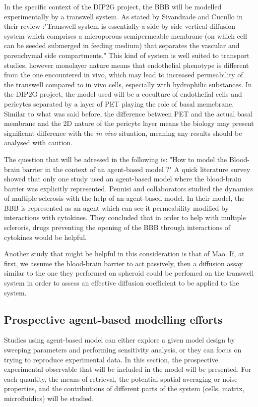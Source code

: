 \documentclass[11pt,a4paper]{article}
\begin{document}
In the specific context of the DIP2G project, the BBB will be modelled experimentally by a transwell system. As stated by Sivandzade and Cucullo in their review :"Transwell system is essentially a side by side vertical diffusion system which comprises a microporous semipermeable membrane (on which cell can be seeded submerged in feeding medium) that separates the vascular and parenchymal side compartments."\cite{Sivandzade2018} This kind of system is well suited to transport studies, however monolayer nature means that endothelial phenotype is different from the one encountered in vivo, which may lead to increased permeability of the transwell compared to in vivo cells, especially with hydrophilic substances. In the DIP2G project, the model used will be a coculture of endothelial cells and pericytes separated by a layer of PET playing the role of basal memebrane. Similar to what was said before, the difference between PET and the actual basal membrane and the 2D nature of the pericyte layer means the biology may present significant difference with the \textit{in vivo} situation, meaning any results should be analysed with caution. 

The question that will be adressed in the following is: "How to model the Blood-brain barrier in the context of an agent-based model ?"
A quick literature survey showed that only one study used an agent-based model where the blood-brain barrier was explicitly represented. Pennisi and collaborators studied the dynamics of multiple sclerosis with the help of an agent-based model.\cite{Pennisi2015} In their model, the BBB is represented as an agent which can see it permeability modified by interactions with cytokines. They concluded that in order to help with multiple scleroris, drugs preventing the opening of the BBB through interactions of cytokines would be helpful.

Another study that might be helpful in this consideration is that of Mao.\cite{Mao2018} If, at first, we assume the blood-brain barrier to act passively, then a diffusion assay similar to the one they performed on spheroid could be perfomed on the transwell system in order to assess an effective diffusion coefficient to be applied to the system. %


\subsection{Prospective agent-based modelling efforts}
Studies using agent-based model can either explore a given model design by sweeping parameters and performing sensitivity analysis, or they can focus on trying to reproduce experimental data. In this section, the prospective experimental observable that will be included in the model will be presented. For each quantity, the means of retrieval, the potential spatial averaging or noise properties, and the contributions of different parts of the system (cells, matrix, microfluidics) will be studied.
\end{document}
